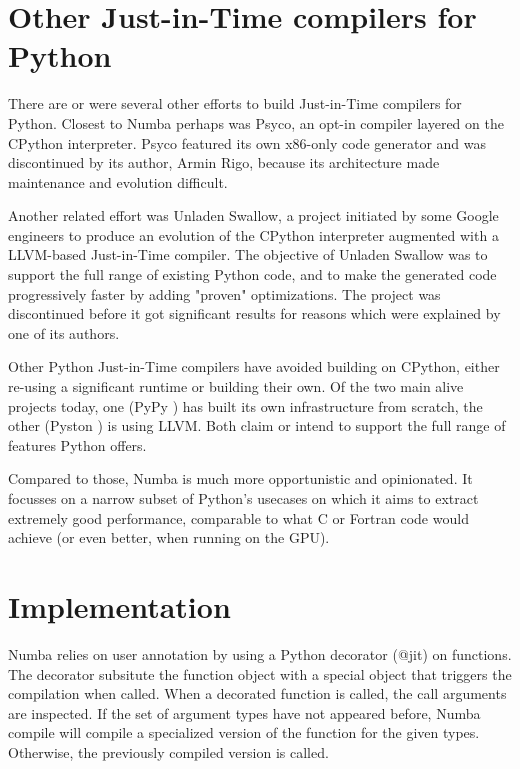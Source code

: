 \documentclass{acm_proc_article-sp}
\begin{document}
\section{Other Just-in-Time compilers for Python}

There are or were several other efforts to build Just-in-Time compilers
for Python.  Closest to Numba perhaps was Psyco, an opt-in compiler layered
on the CPython interpreter.  Psyco featured its own x86-only code generator
and was discontinued by its author, Armin Rigo, because its architecture
made maintenance and evolution difficult.  \cite{projectlink:psyco}
\cite{rigo2004representation}

Another related effort was Unladen Swallow, a project initiated by some
Google engineers to produce an evolution of the CPython interpreter augmented
with a LLVM-based Just-in-Time compiler.  \cite{projectlink:unladen_swallow}
The objective of Unladen Swallow was to support the full range of existing
Python code, and to make the generated code progressively faster by adding
"proven" optimizations.  The project was discontinued before it got
significant results for reasons which were explained by one of its authors.
\cite{kleckner:unladen_swallow_post_mortem}

Other Python Just-in-Time compilers have avoided building on CPython,
either re-using a significant runtime or building their own.  Of the
two main alive projects today, one (PyPy \cite{pypy:pypy}) has built its
own infrastructure from scratch, the other (Pyston \cite{github:pyston})
is using LLVM.  Both claim or intend to support the full range of features
Python offers.

Compared to those, Numba is much more opportunistic and opinionated.
It focusses on a narrow subset of Python's usecases on which it
aims to extract extremely good performance, comparable to what C or Fortran
code would achieve (or even better, when running on the GPU).


\section{Implementation}

Numba relies on user annotation by using a Python decorator (@jit) on functions.
The decorator subsitute the function object with a special object that triggers
the compilation when called. When a decorated function is called,
the call arguments are inspected. If the set of argument types have not appeared
before, Numba compile will compile a specialized version of the function for the
given types. Otherwise, the previously compiled version is called.
\end{document}
